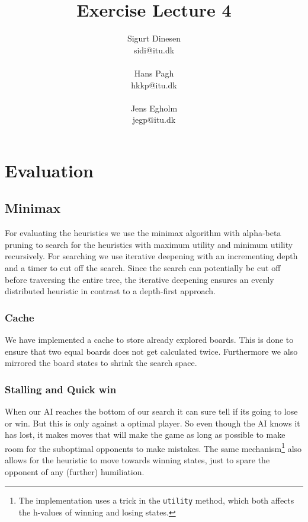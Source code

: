 \documentclass[a4paper, titlepage]{article}
\begin{document}
\title{Exercise Lecture 4}
\author{Sigurt Dinesen \\sidi@itu.dk \\\\ Hans Pagh \\hkkp@itu.dk 
\\\\Jens Egholm \\jegp@itu.dk}
\maketitle
\pagebreak

\section*{Evaluation}
\subsection*{Minimax}
For evaluating the heuristics we use the minimax algorithm with alpha-beta pruning to
search for the heuristics with maximum utility and minimum utility recursively. 
For searching we use iterative deepening with an incrementing depth and a timer to cut off
the search. Since the search can potentially be cut off before traversing the entire tree, 
the iterative deepening ensures an evenly distributed heuristic in contrast to a depth-first
approach.
\subsubsection*{Cache}
We have implemented a cache to store already explored boards. This is done to ensure that 
two equal boards does not get calculated twice. Furthermore we also mirrored the 
board states to shrink the search space.

\subsubsection*{Stalling and Quick win}
When our AI reaches the bottom of our search it can sure tell if its going to lose or win. 
But this is only against a optimal player. So even though the AI knows it has lost, it 
makes moves that will make the game as long as possible to make room for the suboptimal 
opponents to make mistakes. The same mechanism\footnote{The implementation uses a trick 
in the \texttt{utility} method, which both affects the h-values of winning and losing 
states.} also allows for the heuristic to move
towards winning states, just to spare the opponent of any (further) humiliation.
\end{document}
